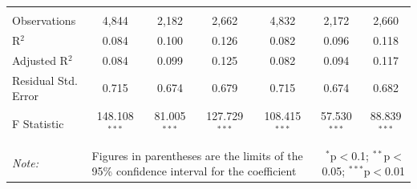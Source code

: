 \documentclass[alpha-refs]{wiley-article-01g}
\begin{document}
\begin{landscape}
\begin{table}[!htbp]
\begin{tabular}{@{\extracolsep{5pt}}lcccccc}
  & & & & & & \\ 
\hline \\[-3ex] 
Observations & 4,844 & 2,182 & 2,662 & 4,832 & 2,172 & 2,660 \\ 
R$^{2}$ & 0.084 & 0.100 & 0.126 & 0.082 & 0.096 & 0.118 \\ 
Adjusted R$^{2}$ & 0.084 & 0.099 & 0.125 & 0.082 & 0.094 & 0.117 \\ 
Residual Std. Error & 0.715 & 0.674 & 0.679 & 0.715 & 0.674 & 0.682 \\ 
F Statistic & 148.108$^{***}$ & 81.005$^{***}$ & 127.729$^{***}$ & 108.415$^{***}$ & 57.530$^{***}$ & 88.839$^{***}$ \\ 
\hline 
\hline \\[-3ex] 
\textit{Note:} &\multicolumn{4}{l}{Figures in parentheses are the limits of the 95\% confidence interval for the coefficient}  & \multicolumn{2}{r}{$^{*}$p$<$0.1; $^{**}$p$<$0.05; $^{***}$p$<$0.01} \\ 
\end{tabular} 
\end{table} 

\end{landscape}

\newpage
\end{document}
